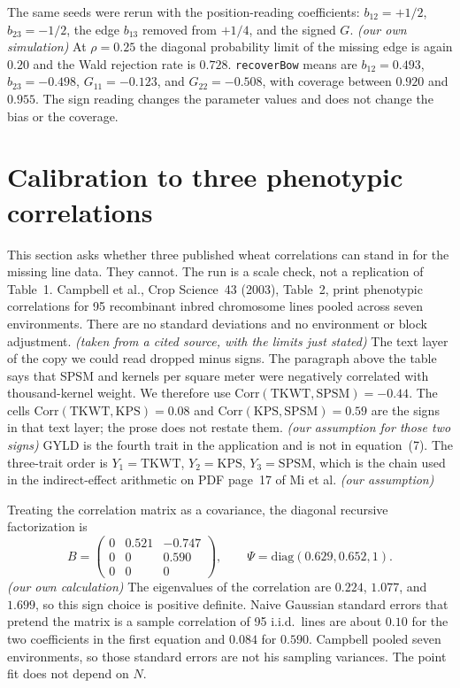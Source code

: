 \documentclass[11pt]{article}
\newcommand{\ev}[1]{\textup{\emph{(#1)}}}
\begin{document}
The same seeds were rerun with the position-reading coefficients: $b_{12}=+1/2$,
$b_{23}=-1/2$, the edge $b_{13}$ removed from $+1/4$, and the signed $G$.
\ev{our own simulation}
At $\rho=0.25$ the diagonal probability limit of the missing edge is again
$0.20$ and the Wald rejection rate is $0.728$. \texttt{recoverBow} means are
$b_{12}=0.493$, $b_{23}=-0.498$, $G_{11}=-0.123$, and $G_{22}=-0.508$, with
coverage between $0.920$ and $0.955$. The sign reading changes the parameter
values and does not change the bias or the coverage.

\section{Calibration to three phenotypic correlations}

This section asks whether three published wheat correlations can stand in
for the missing line data. They cannot. The run is a scale check, not a
replication of Table~1. Campbell et al., Crop Science~43 (2003), Table~2, print phenotypic
correlations for 95 recombinant inbred chromosome lines pooled across seven
environments. There are no standard deviations and no environment or block
adjustment. \ev{taken from a cited source, with the limits just stated}
The text layer of the copy we could read dropped minus signs. The paragraph
above the table says that SPSM and kernels per square meter were negatively
correlated with thousand-kernel weight. We therefore use
$\mathrm{Corr}(\mathrm{TKWT},\mathrm{SPSM})=-0.44$. The cells
$\mathrm{Corr}(\mathrm{TKWT},\mathrm{KPS})=0.08$ and
$\mathrm{Corr}(\mathrm{KPS},\mathrm{SPSM})=0.59$ are the signs in that text
layer; the prose does not restate them. \ev{our assumption for those two signs}
GYLD is the fourth trait in the application and is not in equation~(7). The
three-trait order is $Y_1=\mathrm{TKWT}$, $Y_2=\mathrm{KPS}$,
$Y_3=\mathrm{SPSM}$, which is the chain used in the indirect-effect
arithmetic on PDF page~17 of Mi et al. \ev{our assumption}

Treating the correlation matrix as a covariance, the diagonal recursive
factorization is
\[
B=\begin{pmatrix}0&0.521&-0.747\\0&0&0.590\\0&0&0\end{pmatrix},\qquad
\Psi=\mathrm{diag}(0.629,0.652,1).
\]
\ev{our own calculation}
The eigenvalues of the correlation are $0.224$, $1.077$, and $1.699$, so
this sign choice is positive definite. Naive Gaussian standard errors that
pretend the matrix is a sample correlation of 95 i.i.d.\ lines are about
$0.10$ for the two coefficients in the first equation and $0.084$ for
$0.590$. Campbell pooled seven environments, so those standard errors are not
his sampling variances. The point fit does not depend on $N$.
\end{document}
